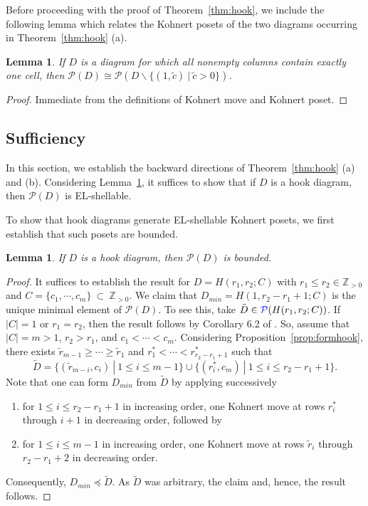 \documentclass[letterpaper,10pt]{article}
\newtheorem{lemma}[theorem]{Lemma}
\newcommand{\bl}[1]{{\color{blue} #1}}
\begin{document}
Before proceeding with the proof of Theorem~\ref{thm:hook}, we include the following lemma which relates the Kohnert posets of the two diagrams occurring in Theorem~\ref{thm:hook} (a).

\begin{lemma}\label{lem:0bpciso}
    If $D$ is a diagram for which all nonempty columns contain exactly one cell, then $\mathcal{P}(D)\cong \mathcal{P}(D\backslash\{(1,\tilde{c})~|~\tilde{c}>0\})$.
\end{lemma}
\begin{proof}
    Immediate from the definitions of Kohnert move and Kohnert poset.
\end{proof}

\subsection{Sufficiency}\label{sec:suffhook}

In this section, we establish the backward directions of Theorem~\ref{thm:hook} (a) and (b). Considering Lemma~\ref{lem:0bpciso}, it suffices to show that if $D$ is a hook diagram, then $\mathcal{P}(D)$ is EL-shellable. 

To show that hook diagrams generate EL-shellable Kohnert posets, we first establish that such posets are bounded.

\begin{lemma}\label{lem:hookbound}
    If $D$ is a hook diagram, then $\mathcal{P}(D)$ is bounded. 
\end{lemma}
\begin{proof}
    It suffices to establish the result for $D=H(r_1,r_2;C)$ with $r_1\le r_2\in\mathbb{Z}_{>0}$ and $C=\{c_1,\cdots,c_m\}~\subset~\mathbb{Z}_{>0}$. We claim that $D_{min}=H(1,r_2-r_1+1;C)$ is the unique minimal element of $\mathcal{P}(D)$. To see this, take $\tilde{D}\in \bl{\mathcal{P}}(H(r_1,r_2;C))$. If $|C|=1$ or $r_1=r_2$, then the result follows by Corollary 6.2 of \textbf{\cite{KPoset1}}. So, assume that $|C|=m>1$, $r_2>r_1$, and $c_1<\cdots<c_m$. Considering Proposition~\ref{prop:formhook}, there exists $\tilde{r}_{m-1}\ge\cdots\ge \tilde{r}_1$ and $r^*_1<\cdots<r^*_{r_2-r_1+1}$ such that $$\tilde{D}=\{(\tilde{r}_{m-i},c_i)~|~1\le i\le m-1\}\cup\{(r^*_i,c_m)~|~1\le i\le r_2-r_1+1\}.$$ Note that one can form $D_{min}$ from $\tilde{D}$ by applying successively
    \begin{enumerate}
        \item[1)] for $1\le i\le r_2-r_1+1$ in increasing order, one Kohnert move at rows $r^*_i$ through $i+1$ in decreasing order, followed by
        \item[2)] for $1\le i\le m-1$ in increasing order, one Kohnert move at rows $\tilde{r}_i$ through $r_2-r_1+2$ in decreasing order.
    \end{enumerate}
    Consequently, $D_{min}\preceq \tilde{D}$. As $\tilde{D}$ was arbitrary, the claim and, hence, the result follows.
\end{proof}
\end{document}
